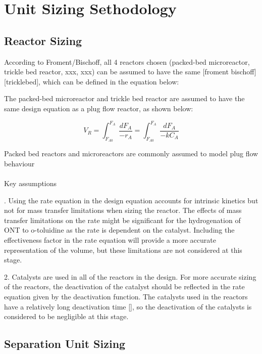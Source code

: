 \section{Unit Sizing Sethodology}
\label{app:sizing}
\subsection{Reactor Sizing}
According to Froment/Bischoff, all 4 reactors chosen (packed-bed microreactor, trickle bed reactor, xxx, xxx) can be assumed to have the same [froment bischoff][tricklebed], which can be defined in the equation below:

The packed-bed microreactor and trickle bed reactor are assumed to have the same design equation as a plug flow reactor, as shown below:

\begin{equation}
    V_R = \int_{F_{A0}}^{F_{A}} \frac{dF_A}{-r_A} = \int_{F_{A0}}^{F_{A}} \frac{dF_A}{-kC_A}
    \label{reactor_sizing}
\end{equation}

Packed bed reactors and microreactors are commonly assumed to model plug flow behaviour 

\paragraph{}{Key assumptions}
 
.  Using the rate equation in the design equation accounts for intrinsic kinetics but not for mass transfer limitations when sizing the reactor. The effects of mass transfer limitations on the rate might be significant for the hydrogenation of ONT to o-toluidine as the rate is dependent on the catalyst. Including the effectiveness factor in the rate equation will provide a more accurate representation of the volume, but these limitations are not considered at this stage.

2.  Catalysts are used in all of the reactors in the design. For more accurate sizing of the reactors, the deactivation of the catalyst should be reflected in the rate equation given by the deactivation function. The catalysts used in the reactors have a relatively long deactivation time [], so the deactivation of the catalysts is considered to be negligible at this stage. 

\subsection{Separation Unit Sizing}

